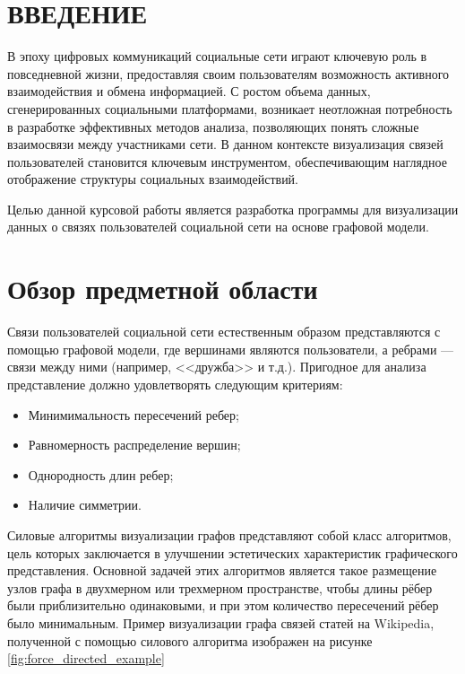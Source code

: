 \documentclass[14pt, russian]{scrartcl}
\newcommand{\anonsection}[1]{\cleardoublepage
\phantomsection
\addcontentsline{toc}{section}{\protect\numberline{}#1}
\section*{#1}\vspace*{2.5ex} %
}
\begin{document}

\setlength{\tabcolsep}{3pt}
\newpage
\setcounter{page}{2}

\newpage
\renewcommand\contentsname{\hfill{\normalfont{СОДЕРЖАНИЕ}}\hfill}  %
\tableofcontents
\newpage
\anonsection{ВВЕДЕНИЕ}  %

В эпоху цифровых коммуникаций социальные сети играют ключевую роль в повседневной жизни, предоставляя своим пользователям возможность активного взаимодействия и обмена информацией.
С ростом объема данных, сгенерированных социальными платформами, возникает неотложная потребность в разработке эффективных методов анализа, позволяющих понять сложные взаимосвязи между участниками сети. В данном контексте визуализация связей пользователей становится ключевым инструментом, обеспечивающим наглядное отображение структуры социальных взаимодействий.

Целью данной курсовой работы является разработка программы для
визуализации данных о связях пользователей социальной сети на основе графовой модели.

\section{Обзор предметной области}

Связи пользователей социальной сети естественным образом представляются с помощью графовой модели,
где вершинами являются пользователи, а ребрами --- связи между ними (например, <<дружба>> и т.д.).
Пригодное для анализа представление должно удовлетворять следующим критериям:

\begin{itemize}
	\item Минимимальность пересечений ребер;
	\item Равномерность распределение вершин; 
	\item Однородность длин ребер; 
	\item Наличие симметрии.
\end{itemize}

Силовые алгоритмы визуализации графов представляют собой класс алгоритмов, цель которых заключается в улучшении эстетических характеристик графического представления.
Основной задачей этих алгоритмов является такое размещение узлов графа в двухмерном или трехмерном пространстве, чтобы длины рёбер были приблизительно одинаковыми,
и при этом количество пересечений рёбер было минимальным.
Пример визуализации графа связей статей на Wikipedia, полученной с помощью силового алгоритма изображен на рисунке \ref{fig:force_directed_example} 
\end{document}

